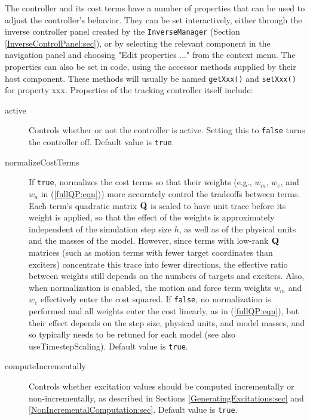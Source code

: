 The controller and its cost terms have a number of properties that can be used
to adjust the controller's behavior. They can be set interactively,
either through the inverse
controller panel created by the {\tt InverseManager} (Section
\ref{InverseControlPanel:sec}), or 
by selecting the relevant component in the navigation panel and choosing {\sf
"Edit properties ..."} from the context menu. The properties can also be set
in code, using the accessor methods supplied by their host component.  These
methods will usually be named {\tt getXxx()} and {\tt setXxx()} for
property {\sf xxx}. Properties of the tracking controller itself include:

\begin{description}

\item[active]\mbox{}

Controls whether or not the controller is active. Setting this to {\tt false}
turns the controller off. Default value is {\tt true}.

\item[normalizeCostTerms]\mbox{}

If {\tt true}, normalizes the cost terms so that their weights (e.g., $w_m$,
$w_e$, and $w_a$ in (\ref{fullQP:eqn})) more accurately control the tradeoffs
between terms. Each term's quadratic matrix ${\bf Q}$ is scaled to have unit
trace before its weight is applied, so that the effect of the weights is
approximately independent of the simulation step size $h$, as well as of
the physical units and the masses of the model. However, since terms with
low-rank ${\bf Q}$ matrices (such as motion terms with fewer target coordinates
than exciters) concentrate this trace into fewer directions, the effective
ratio between weights still depends on the numbers of targets and exciters.
Also, when normalization is enabled, the motion and force term weights $w_m$
and $w_e$ effectively enter the cost squared.
If {\tt false}, no normalization is performed and all weights enter the cost
linearly, as in (\ref{fullQP:eqn}), but their effect depends on the step
size, physical units, and model masses, and so typically needs to be retuned
for each model (see also {\sf useTimestepScaling}).
Default value is {\tt true}.

\item[computeIncrementally]\mbox{}

Controls whether excitation values should be computed incrementally or
non-incrementally, as described in Sections \ref{GeneratingExcitations:sec}
and \ref{NonIncrementalComputation:sec}.  Default value is {\tt true}.


\end{description}
